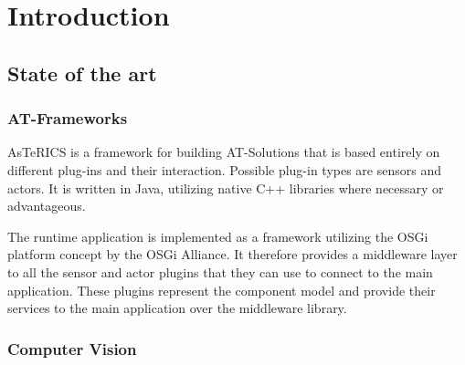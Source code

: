 \documentclass[BSA,Bachelor,english]{twbook}%
\begin{document}
{{{    \newcommand{\citefigm}[2]{(Source: taken with modification from \protect\cite{#1}, p. #2)}%
    \newcommand{\citep}{\citeasnoun}%
    \newcommand{\acessedthrough}{Available at:}%
    \newcommand{\acessedthroughp}{Available through:}%
    \newcommand{\acessedat}{Accessed}%
    \newcommand{\singlepage}{p.}%
    \newcommand{\multiplepages}{pp.}%
    \newcommand{\chapternr}{Ch.}%
    \renewcommand{\harvardand}{\&}%
    \newcommand{\abstractonly}{Abstract only}
    \newcommand{\edition}{~edition}%
}}}

\maketitle

%
%
\chapter{Introduction}



\section{State of the art}
\subsection{AT-Frameworks}
AsTeRICS is a framework for building AT-Solutions that is based entirely on different plug-ins and their interaction. Possible plug-in types are sensors and actors. It is written in Java, utilizing native C++ libraries where necessary or advantageous.

The runtime application is implemented as a framework utilizing the OSGi platform concept by the OSGi Alliance. It therefore provides a middleware layer to all the sensor and actor plugins that they can use to connect to the main application. These plugins represent the component model and provide their services to the main application over the middleware library.
\subsection{Computer Vision}
\end{document}
